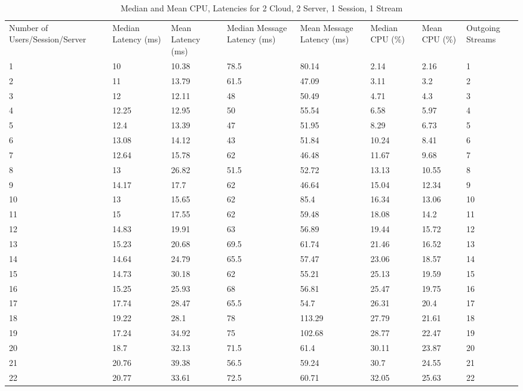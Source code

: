 \begin{table}
\caption{Median and Mean CPU, Latencies for 2 Cloud, 2 Server, 1 Session, 1 Stream}
\label{table:2cld_2serv_1sess_1str}
\begin{tabu} to\linewidth{|X[c]|X[c]|X[c]|X[c]|X[c]|X[c]|X[c]|X[c]|}
\everyrow{\hline}
\hline
Number of Users/Session/Server & Median Latency (ms) & Mean Latency (ms) & Median Message Latency (ms) & Mean Message Latency (ms) & Median CPU (\%) & Mean CPU (\%) & Outgoing Streams\\
1 & 10 & 10.38 & 78.5 & 80.14 & 2.14 & 2.16 & 1 \\
2 & 11 & 13.79 & 61.5 & 47.09 & 3.11 & 3.2 & 2 \\
3 & 12 & 12.11 & 48 & 50.49 & 4.71 & 4.3 & 3 \\
4 & 12.25 & 12.95 & 50 & 55.54 & 6.58 & 5.97 & 4 \\
5 & 12.4 & 13.39 & 47 & 51.95 & 8.29 & 6.73 & 5 \\
6 & 13.08 & 14.12 & 43 & 51.84 & 10.24 & 8.41 & 6 \\
7 & 12.64 & 15.78 & 62 & 46.48 & 11.67 & 9.68 & 7 \\
8 & 13 & 26.82 & 51.5 & 52.72 & 13.13 & 10.55 & 8 \\
9 & 14.17 & 17.7 & 62 & 46.64 & 15.04 & 12.34 & 9 \\
10 & 13 & 15.65 & 62 & 85.4 & 16.34 & 13.06 & 10 \\
11 & 15 & 17.55 & 62 & 59.48 & 18.08 & 14.2 & 11 \\
12 & 14.83 & 19.91 & 63 & 56.89 & 19.44 & 15.72 & 12 \\
13 & 15.23 & 20.68 & 69.5 & 61.74 & 21.46 & 16.52 & 13 \\
14 & 14.64 & 24.79 & 65.5 & 57.47 & 23.06 & 18.57 & 14 \\
15 & 14.73 & 30.18 & 62 & 55.21 & 25.13 & 19.59 & 15 \\
16 & 15.25 & 25.93 & 68 & 56.81 & 25.47 & 19.75 & 16 \\
17 & 17.74 & 28.47 & 65.5 & 54.7 & 26.31 & 20.4 & 17 \\
18 & 19.22 & 28.1 & 78 & 113.29 & 27.79 & 21.61 & 18 \\
19 & 17.24 & 34.92 & 75 & 102.68 & 28.77 & 22.47 & 19 \\
20 & 18.7 & 32.13 & 71.5 & 61.4 & 30.11 & 23.87 & 20 \\
21 & 20.76 & 39.38 & 56.5 & 59.24 & 30.7 & 24.55 & 21 \\
22 & 20.77 & 33.61 & 72.5 & 60.71 & 32.05 & 25.63 & 22 \\

\end{tabu}
\end{table}
